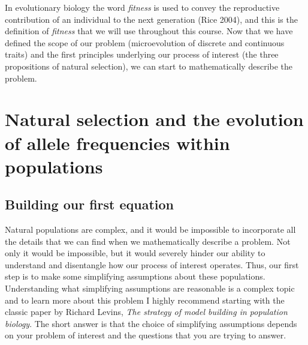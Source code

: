 \documentclass[
]{book}
\begin{document}
In evolutionary biology the word \emph{fitness} is used to convey the reproductive contribution of an individual to the next generation (Rice 2004), and this is the definition of \emph{fitness} that we will use throughout this course. Now that we have defined the scope of our problem (microevolution of discrete and continuous traits) and the first principles underlying our process of interest (the three propositions of natural selection), we can start to mathematically describe the problem.

\hypertarget{natural-selection-and-the-evolution-of-allele-frequencies-within-populations}{%
\section{Natural selection and the evolution of allele frequencies within populations}\label{natural-selection-and-the-evolution-of-allele-frequencies-within-populations}}

\hypertarget{building-our-first-equation}{%
\subsection{Building our first equation}\label{building-our-first-equation}}

Natural populations are complex, and it would be impossible to incorporate all the details that we can find when we mathematically describe a problem. Not only it would be impossible, but it would severely hinder our ability to understand and disentangle how our process of interest operates. Thus, our first step is to make some simplifying assumptions about these populations. Understanding what simplifying assumptions are reasonable is a complex topic and to learn more about this problem I highly recommend starting with the classic paper by Richard Levins, \emph{The strategy of model building in population biology}. The short answer is that the choice of simplifying assumptions depends on your problem of interest and the questions that you are trying to answer.
\end{document}
